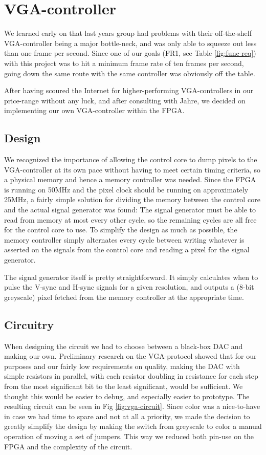 \section{VGA-controller}

We learned early on that last years group had problems with their off-the-shelf
VGA-controller being a major bottle-neck, and was only able to squeeze out less
than one frame per second. Since one of our goals ({\sc FR1}, see Table
\ref{fig:func-req}) with this project was to hit a minimum frame rate of ten
frames per second, going down the same route with the same controller was
obviously off the table.

After having scoured the Internet for higher-performing VGA-controllers in our
price-range without any luck, and after consulting with Jahre, we decided on
implementing our own VGA-controller within the FPGA.



\subsection{Design}
We recognized the importance of allowing the control core to dump pixels to the
VGA-controller at its own pace without having to meet certain timing criteria,
so a physical memory and hence a memory controller was needed. Since the FPGA
is running on 50MHz and the pixel clock should be running on approximately
25MHz, a fairly simple solution for dividing the memory between the control
core and the actual signal generator was found: The signal generator must be
able to read from memory at most every other cycle, so the remaining cycles are
all free for the control core to use. To simplify the design as much as
possible, the memory controller simply alternates every cycle between writing
whatever is asserted on the signals from the control core and reading a pixel
for the signal generator.

The signal generator itself is pretty straightforward. It simply calculates
when to pulse the V-sync and H-sync signals for a given resolution, and outputs
a (8-bit greyscale) pixel fetched from the memory controller at the appropriate
time.

\subsection{Circuitry}

When designing the circuit we had to choose between a black-box DAC and making our own. Preliminary research on the
VGA-protocol showed that for our purposes and our fairly low requirements on
quality, making the DAC with simple resistors in parallel, with each resistor
doubling in resistance for each step from the most significant bit to the least
significant, would be sufficient. We thought this would be easier to debug, and
especially easier to prototype. The resulting circuit can be seen in Fig
\ref{fig:vga-circuit}. Since color was a nice-to-have in case we had time to
spare and not at all a priority, we made the decision to greatly simplify the
design by making the switch from greyscale to color a manual operation of
moving a set of jumpers. This way we reduced both pin-use on the FPGA and the
complexity of the circuit.
